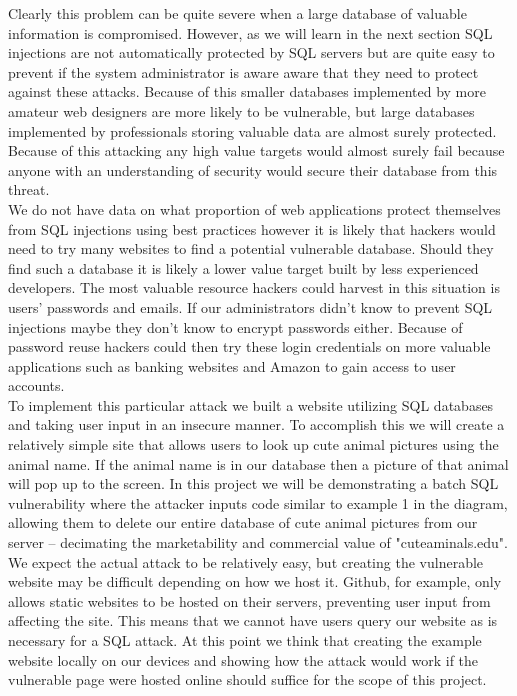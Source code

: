 \documentclass[11pt]{article}
\begin{document}
Clearly this problem can be quite severe when a large database of valuable information is compromised. However, as we will learn in the next section SQL injections are not automatically protected by SQL servers but are quite easy to prevent if the system administrator is aware aware that they need to protect against these attacks. Because of this smaller databases implemented by more amateur web designers are more likely to be vulnerable, but large databases implemented by professionals storing valuable data are almost surely protected. Because of this attacking any high value targets would almost surely fail because anyone with an understanding of security would secure their database from this threat. \\

We do not have data on what proportion of web applications protect themselves from SQL injections using best practices however it is likely that hackers would need to try many websites to find a potential vulnerable database. Should they find such a database it is likely a lower value target built by less experienced developers. The most valuable resource hackers could harvest in this situation is users' passwords and emails. If our administrators didn't know to prevent SQL injections maybe they don't know to encrypt passwords either. Because of password reuse hackers could then try these login credentials on more valuable applications such as banking websites and Amazon to gain access to user accounts. \\ 

To implement this particular attack we built a website utilizing SQL databases and taking user input in an insecure manner. To accomplish this we will create a relatively simple site that allows users to look up cute animal pictures using the animal name. If the animal name is in our database then a picture of that animal will pop up to the screen. In this project we will be demonstrating a batch SQL vulnerability where the attacker inputs code similar to example 1 in the diagram, allowing them to delete our entire database of cute animal pictures from our server -- decimating the marketability and commercial value of "cuteaminals.edu". We expect the actual attack to be relatively easy, but creating the vulnerable website may be difficult depending on how we host it. Github, for example, only allows static websites to be hosted on their servers, preventing user input from affecting the site. This means that we cannot have users query our website as is necessary for a SQL attack. At this point we think that creating the example website locally on our devices and showing how the attack would work if the vulnerable page were hosted online should suffice for the scope of this project. 
\end{document}
